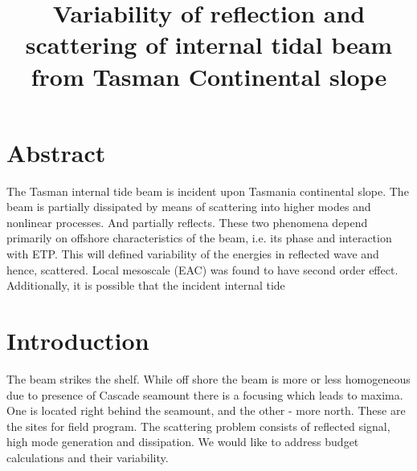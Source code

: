 



\title{Variability of reflection and scattering of internal tidal beam from Tasman Continental slope}
\maketitle

\section{Abstract}
The Tasman internal tide beam is incident upon Tasmania continental slope. The beam is partially dissipated by means of scattering into higher modes and nonlinear processes. And partially reflects. These two phenomena depend primarily on offshore characteristics of the beam, i.e. its phase and interaction with ETP. This will defined variability of the energies in reflected wave and hence, scattered. Local mesoscale (EAC) was found to have second order effect. Additionally, it is possible that the incident internal tide

\section{Introduction}
The beam strikes the shelf. While off shore the beam is more or less homogeneous due to presence of Cascade seamount there is a focusing which leads to maxima. One is located right behind the seamount, and the other - more north. These are the sites for field program. The scattering problem consists of reflected signal, high mode generation and dissipation. We would like to address budget calculations and their variability.

